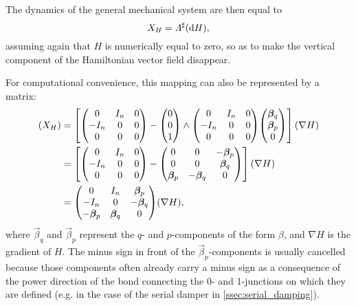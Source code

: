 The dynamics of the general mechanical system are then equal to 
\begin{equation} 
    X_H = \Lambda^\sharp(\dd{H}), 
    \label{eq:general_isomorphism}
\end{equation}
assuming again that $H$ is numerically equal to zero, so as to make the vertical component of the Hamiltonian vector field disappear. 

For computational convenience, this mapping can also be represented by a matrix: 
\begin{equation}
    \begin{split}
        (X_H) &= \qty[\mqty( 0 & I_n & 0 \\  -I_n & 0 & 0 \\ 0 & 0 & 0) 
                - \mqty(0 \\ 0 \\ 1) \wedge \mqty( 0 & I_n & 0 \\  -I_n & 0 & 0 \\ 0 & 0 & 0) \mqty(\vec{\beta}_{q} \\ \vec{\beta}_{p}\\0)](\nabla H) \\
              &= \qty[\mqty( 0 & I_n & 0 \\  -I_n & 0 & 0 \\ 0 & 0 & 0) 
                 - \mqty(0 & 0 & -\vec{\beta}_p \\ 0 & 0 & \vec{\beta}_q \\ \vec{\beta}_p &  -\vec{\beta}_q & 0 )](\nabla H) \\
              &= \mqty( 0 & I_n & \vec{\beta}_p \\  -I_n & 0 & -\vec{\beta}_q \\ -\vec{\beta}_p & \vec{\beta}_q & 0)(\nabla H),
    \end{split}
    \label{eq:matrix_jacobi_mapping}
\end{equation}
where $\vec{\beta}_q$ and $\vec{\beta}_p$ represent the $q$- and $p$-components of the form $\beta$, and $\nabla H$ is the gradient of $H$. The minus sign in front of the $\vec{\beta}_p$-components is usually cancelled because those components often already carry a minus sign as a consequence of the power direction of the bond connecting the 0- and 1-junctions on which they are defined (e.g. in the case of the serial damper in \cref{ssec:serial_damping}).

